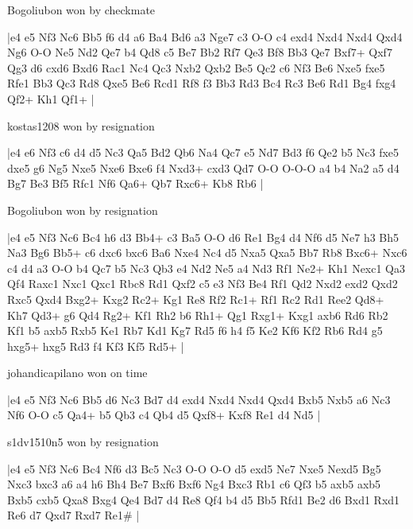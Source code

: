 \showboard

Bogoliubon won by checkmate

\makegametitle
|e4 e5 Nf3 Nc6 Bb5 f6 d4 a6 Ba4 Bd6 a3 Nge7 c3 O-O c4 exd4 Nxd4 Nxd4 Qxd4 Ng6 O-O Ne5 Nd2 Qe7 b4 Qd8 c5 Be7 Bb2 Rf7 Qe3 Bf8 Bb3 Qe7 Bxf7+ Qxf7 Qg3 d6 cxd6 Bxd6 Rac1 Nc4 Qc3 Nxb2 Qxb2 Be5 Qc2 c6 Nf3 Be6 Nxe5 fxe5 Rfe1 Bb3 Qc3 Rd8 Qxe5 Be6 Rcd1 Rf8 f3 Bb3 Rd3 Bc4 Rc3 Be6 Rd1 Bg4 fxg4 Qf2+ Kh1 Qf1+  |

\showboard

kostas1208 won by resignation

\makegametitle
|e4 e6 Nf3 c6 d4 d5 Nc3 Qa5 Bd2 Qb6 Na4 Qc7 e5 Nd7 Bd3 f6 Qe2 b5 Nc3 fxe5 dxe5 g6 Ng5 Nxe5 Nxe6 Bxe6 f4 Nxd3+ cxd3 Qd7 O-O O-O-O a4 b4 Na2 a5 d4 Bg7 Be3 Bf5 Rfc1 Nf6 Qa6+ Qb7 Rxc6+ Kb8 Rb6  |

\showboard

Bogoliubon won by resignation

\makegametitle
|e4 e5 Nf3 Nc6 Bc4 h6 d3 Bb4+ c3 Ba5 O-O d6 Re1 Bg4 d4 Nf6 d5 Ne7 h3 Bh5 Na3 Bg6 Bb5+ c6 dxc6 bxc6 Ba6 Nxe4 Nc4 d5 Nxa5 Qxa5 Bb7 Rb8 Bxc6+ Nxc6 c4 d4 a3 O-O b4 Qc7 b5 Nc3 Qb3 e4 Nd2 Ne5 a4 Nd3 Rf1 Ne2+ Kh1 Nexc1 Qa3 Qf4 Raxc1 Nxc1 Qxc1 Rbc8 Rd1 Qxf2 c5 e3 Nf3 Be4 Rf1 Qd2 Nxd2 exd2 Qxd2 Rxc5 Qxd4 Bxg2+ Kxg2 Rc2+ Kg1 Re8 Rf2 Rc1+ Rf1 Rc2 Rd1 Ree2 Qd8+ Kh7 Qd3+ g6 Qd4 Rg2+ Kf1 Rh2 b6 Rh1+ Qg1 Rxg1+ Kxg1 axb6 Rd6 Rb2 Kf1 b5 axb5 Rxb5 Ke1 Rb7 Kd1 Kg7 Rd5 f6 h4 f5 Ke2 Kf6 Kf2 Rb6 Rd4 g5 hxg5+ hxg5 Rd3 f4 Kf3 Kf5 Rd5+  |

\showboard

johandicapilano won on time

\makegametitle
|e4 e5 Nf3 Nc6 Bb5 d6 Nc3 Bd7 d4 exd4 Nxd4 Nxd4 Qxd4 Bxb5 Nxb5 a6 Nc3 Nf6 O-O c5 Qa4+ b5 Qb3 c4 Qb4 d5 Qxf8+ Kxf8 Re1 d4 Nd5  |

\showboard

s1dv1510n5 won by resignation

\makegametitle
|e4 e5 Nf3 Nc6 Bc4 Nf6 d3 Bc5 Nc3 O-O O-O d5 exd5 Ne7 Nxe5 Nexd5 Bg5 Nxc3 bxc3 a6 a4 h6 Bh4 Be7 Bxf6 Bxf6 Ng4 Bxc3 Rb1 c6 Qf3 b5 axb5 axb5 Bxb5 cxb5 Qxa8 Bxg4 Qe4 Bd7 d4 Re8 Qf4 b4 d5 Bb5 Rfd1 Be2 d6 Bxd1 Rxd1 Re6 d7 Qxd7 Rxd7 Re1\#  |

